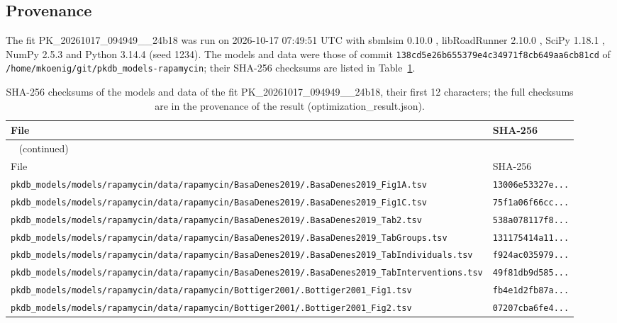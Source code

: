 \subsection{Provenance}

The fit PK\_20261017\_094949\_\_24b18 was run on 2026-10-17 07:49:51 UTC with sbmlsim 0.10.0 \cite{Koenig2026_sbmlsim}, libRoadRunner 2.10.0 \cite{Welsh2023}, SciPy 1.18.1 \cite{Virtanen2020}, NumPy 2.5.3 \cite{Harris2020} and Python 3.14.4 (seed 1234). The models and data were those of commit \texttt{138cd5e26b655379e4c34971f8cb649aa6cb81cd} of \texttt{/home/mkoenig/git/pkdb\_models-rapamycin}; their SHA-256 checksums are listed in Table~\ref{tab:checksums:PK_20261017_094949__24b18}.

\begin{longtable}{ll}
\caption{SHA-256 checksums of the models and data of the fit PK\_20261017\_094949\_\_24b18, their first 12 characters; the full checksums are in the provenance of the result (optimization\_result.json).}\label{tab:checksums:PK_20261017_094949__24b18} \\
\toprule
File & SHA-256 \\
\midrule
\endfirsthead
\multicolumn{2}{l}{\small\tablename~\thetable{} (continued)} \\
\toprule
File & SHA-256 \\
\midrule
\endhead
\bottomrule
\endlastfoot
\texttt{pkdb\_models/models/rapamycin/data/rapamycin/BasaDenes2019/.BasaDenes2019\_Fig1A.tsv} & \texttt{13006e53327e...} \\
\texttt{pkdb\_models/models/rapamycin/data/rapamycin/BasaDenes2019/.BasaDenes2019\_Fig1C.tsv} & \texttt{75f1a06f66cc...} \\
\texttt{pkdb\_models/models/rapamycin/data/rapamycin/BasaDenes2019/.BasaDenes2019\_Tab2.tsv} & \texttt{538a078117f8...} \\
\texttt{pkdb\_models/models/rapamycin/data/rapamycin/BasaDenes2019/.BasaDenes2019\_TabGroups.tsv} & \texttt{131175414a11...} \\
\texttt{pkdb\_models/models/rapamycin/data/rapamycin/BasaDenes2019/.BasaDenes2019\_TabIndividuals.tsv} & \texttt{f924ac035979...} \\
\texttt{pkdb\_models/models/rapamycin/data/rapamycin/BasaDenes2019/.BasaDenes2019\_TabInterventions.tsv} & \texttt{49f81db9d585...} \\
\texttt{pkdb\_models/models/rapamycin/data/rapamycin/Bottiger2001/.Bottiger2001\_Fig1.tsv} & \texttt{fb4e1d2fb87a...} \\
\texttt{pkdb\_models/models/rapamycin/data/rapamycin/Bottiger2001/.Bottiger2001\_Fig2.tsv} & \texttt{07207cba6fe4...} \\

\end{longtable}
